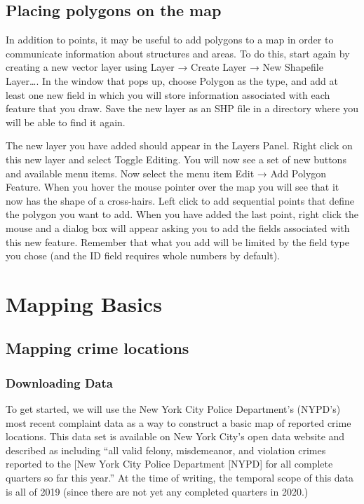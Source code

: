 \documentclass[]{book}
\begin{document}
\hypertarget{placing-polygons-on-the-map}{%
\section{Placing polygons on the map}\label{placing-polygons-on-the-map}}

In addition to points, it may be useful to add polygons to a map in order to communicate information about structures and areas. To do this, start again by creating a new vector layer using Layer → Create Layer → New Shapefile Layer\ldots{}. In the window that pops up, choose Polygon as the type, and add at least one new field in which you will store information associated with each feature that you draw. Save the new layer as an SHP file in a directory where you will be able to find it again.

The new layer you have added should appear in the Layers Panel. Right click on this new layer and select Toggle Editing. You will now see a set of new buttons and available menu items. Now select the menu item Edit → Add Polygon Feature. When you hover the mouse pointer over the map you will see that it now has the shape of a cross-hairs. Left click to add sequential points that define the polygon you want to add. When you have added the last point, right click the mouse and a dialog box will appear asking you to add the fields associated with this new feature. Remember that what you add will be limited by the field type you chose (and the ID field requires whole numbers by default).

\hypertarget{mapping-basics}{%
\chapter{Mapping Basics}\label{mapping-basics}}

\hypertarget{mapping-crime-locations}{%
\section{Mapping crime locations}\label{mapping-crime-locations}}

\hypertarget{downloading-data}{%
\subsection{Downloading Data}\label{downloading-data}}

To get started, we will use the New York City Police Department's (NYPD's) most recent complaint data as a way to construct a basic map of reported crime locations. This data set is available on New York City's open data website and described as including ``all valid felony, misdemeanor, and violation crimes reported to the {[}New York City Police Department {[}NYPD{]} for all complete quarters so far this year.'' At the time of writing, the temporal scope of this data is all of 2019 (since there are not yet any completed quarters in 2020.)
\end{document}
